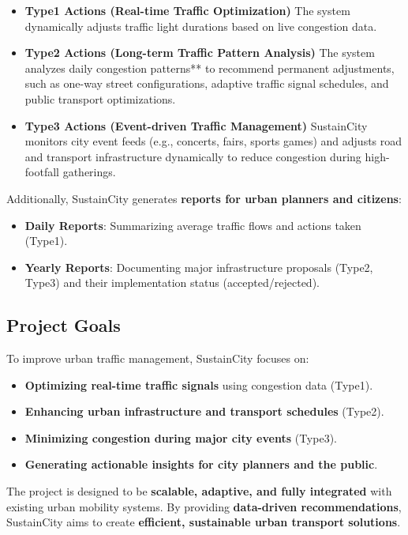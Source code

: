 \documentclass[a4paper,12pt]{article}
\begin{document}
\begin{itemize}
    \item \textbf{Type1 Actions (Real-time Traffic Optimization)} 
    The system dynamically adjusts traffic light durations based on live congestion data.  

    \item \textbf{Type2 Actions (Long-term Traffic Pattern Analysis)}  
    The system analyzes daily congestion patterns** to recommend permanent adjustments, such as one-way street configurations, adaptive traffic signal schedules, and public transport optimizations.

    \item \textbf{Type3 Actions (Event-driven Traffic Management)}
    SustainCity monitors city event feeds (e.g., concerts, fairs, sports games) and adjusts road and transport infrastructure dynamically to reduce congestion during high-footfall gatherings.
\end{itemize}

\noindent Additionally, SustainCity generates \textbf{reports for urban planners and citizens}:
\begin{itemize}
    \item \textbf{Daily Reports}: Summarizing average traffic flows and actions taken (Type1).
    \item \textbf{Yearly Reports}: Documenting major infrastructure proposals (Type2, Type3) and their implementation status (accepted/rejected).
\end{itemize}

\subsection{Project Goals}
To improve urban traffic management, SustainCity focuses on:
\begin{itemize}
    \item \textbf{Optimizing real-time traffic signals} using congestion data (Type1).
    \item \textbf{Enhancing urban infrastructure and transport schedules} (Type2).
    \item \textbf{Minimizing congestion during major city events} (Type3).
    \item \textbf{Generating actionable insights for city planners and the public}.
\end{itemize}

The project is designed to be \textbf{scalable, adaptive, and fully integrated} with existing urban mobility systems. By providing \textbf{data-driven recommendations}, SustainCity aims to create \textbf{efficient, sustainable urban transport solutions}.
\end{document}
